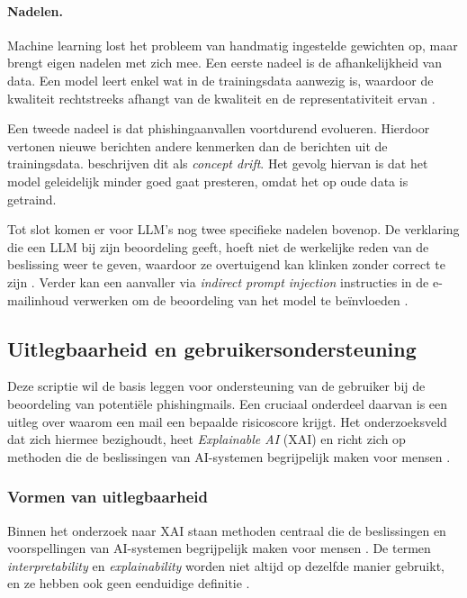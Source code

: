 \paragraph{Nadelen.}
\label{subsubsec:machinelearning-detectie:nadelen}
Machine learning lost het probleem van handmatig ingestelde gewichten op, maar brengt eigen nadelen met zich mee. Een eerste nadeel is de afhankelijkheid van data. Een model leert enkel wat in de trainingsdata aanwezig is, waardoor de kwaliteit rechtstreeks afhangt van de kwaliteit en de representativiteit ervan \autocite{Mendes2025}.

Een tweede nadeel is dat phishingaanvallen voortdurend evolueren. Hierdoor vertonen nieuwe berichten andere kenmerken dan de berichten uit de trainingsdata. \textcite{Fernando2026} beschrijven dit als \emph{concept drift}. Het gevolg hiervan is dat het model geleidelijk minder goed gaat presteren, omdat het op oude data is getraind.

Tot slot komen er voor LLM's nog twee specifieke nadelen bovenop. De verklaring die een LLM bij zijn beoordeling geeft, hoeft niet de werkelijke reden van de beslissing weer te geven, waardoor ze overtuigend kan klinken zonder correct te zijn \autocite{Turpin2023}. Verder kan een aanvaller via \emph{indirect prompt injection} instructies in de e-mailinhoud verwerken om de beoordeling van het model te beïnvloeden \autocite{Greshake2023}.


\subsection{Uitlegbaarheid en gebruikersondersteuning}
\label{subsec:uitlegbaarheid-en-gebruikersondersteuning}

Deze scriptie wil de basis leggen voor ondersteuning van de gebruiker bij de beoordeling van potentiële phishingmails. Een cruciaal onderdeel daarvan is een uitleg over waarom een mail een bepaalde risicoscore krijgt. Het onderzoeksveld dat zich hiermee bezighoudt, heet \emph{Explainable AI} (XAI) en richt zich op methoden die de beslissingen van AI-systemen begrijpelijk maken voor mensen \autocite{Guidotti2018}.

\subsubsection{Vormen van uitlegbaarheid}
\label{subsubsec:vormen-van-uitlegbaarheid}

Binnen het onderzoek naar XAI staan methoden centraal die de beslissingen en voorspellingen van AI-systemen begrijpelijk maken voor mensen \autocite{Miller2017}. De termen \emph{interpretability} en \emph{explainability} worden niet altijd op dezelfde manier gebruikt, en ze hebben ook geen eenduidige definitie \autocite{Lipton2016}. 

